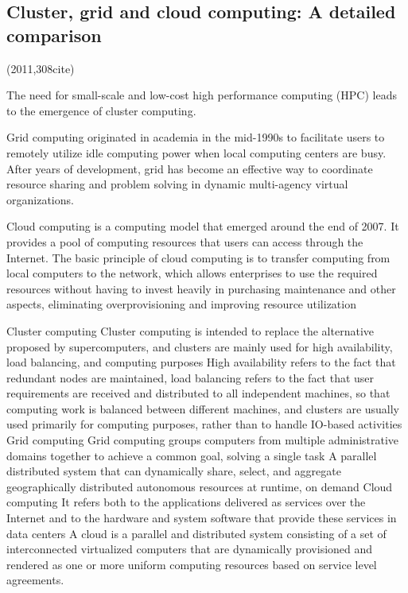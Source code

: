\documentclass[a4paper,twoside]{scrbook}
\begin{document}
\subsection{Cluster, grid and cloud computing: A detailed comparison \cite{sadashiv2011cluster}}
(2011,308cite)\par
The need for small-scale and low-cost high performance computing (HPC) leads to the emergence of cluster computing.
\par
Grid computing originated in academia in the mid-1990s to facilitate users to remotely utilize idle computing power when local computing centers are busy.
After years of development, grid has become an effective way to coordinate resource sharing and problem solving in dynamic multi-agency virtual organizations.
\par
Cloud computing is a computing model that emerged around the end of 2007. It provides a pool of computing resources that users can access through the Internet.
The basic principle of cloud computing is to transfer computing from local computers to the network, which allows enterprises to use the required resources without having to invest heavily in purchasing maintenance and other aspects, eliminating overprovisioning and improving resource utilization
\par
\par
Cluster computing
Cluster computing is intended to replace the alternative proposed by supercomputers, and clusters are mainly used for high availability, load balancing, and computing purposes
High availability refers to the fact that redundant nodes are maintained, load balancing refers to the fact that user requirements are received and distributed to all independent machines, so that computing work is balanced between different machines, and clusters are usually used primarily for computing purposes, rather than to handle IO-based activities
Grid computing
Grid computing groups computers from multiple administrative domains together to achieve a common goal, solving a single task
A parallel distributed system that can dynamically share, select, and aggregate geographically distributed autonomous resources at runtime, on demand
Cloud computing
It refers both to the applications delivered as services over the Internet and to the hardware and system software that provide these services in data centers
A cloud is a parallel and distributed system consisting of a set of interconnected virtualized computers that are dynamically provisioned and rendered as one or more uniform computing resources based on service level agreements.
\end{document}
